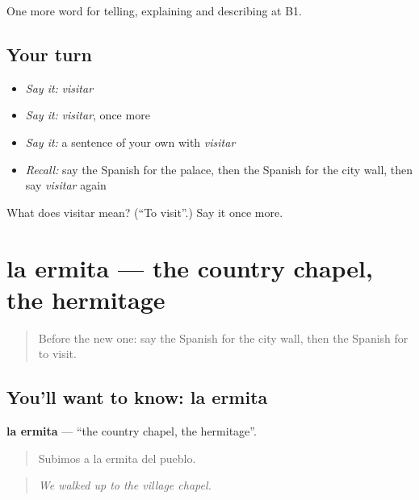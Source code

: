 \begin{grammarlens}[title={What you've built}]
One more word for telling, explaining and describing at B1.
\end{grammarlens}

\subsection*{Your turn}
\begin{itemize}
\raggedright
  \item \emph{Say it:} \emph{visitar}
  \item \emph{Say it:} \emph{visitar}, once more
  \item \emph{Say it:} a sentence of your own with \emph{visitar}
  \item \emph{Recall:} say the Spanish for the palace, then the Spanish for the city wall, then say \emph{visitar} again
\end{itemize}

\begin{tcolorbox}[breakable,colback=teal!4,colframe=teal!35!black,title={Before you move on}]
What does visitar mean? (\textquotedblleft{}To visit\textquotedblright{}.) Say it once more.
\end{tcolorbox}
\section[la ermita]{la ermita — the country chapel, the hermitage}

\label{lesson:ES-C678-ermita}



\begin{quote}
Before the new one: say the Spanish for the city wall, then the Spanish for to visit.
\end{quote}

\subsection*{You'll want to know: la ermita}
\textbf{la ermita} — \textquotedblleft{}the country chapel, the hermitage\textquotedblright{}.

\begin{quote}
Subimos a la ermita del pueblo.
\end{quote}

\begin{quote}
\emph{We walked up to the village chapel.}
\end{quote}

